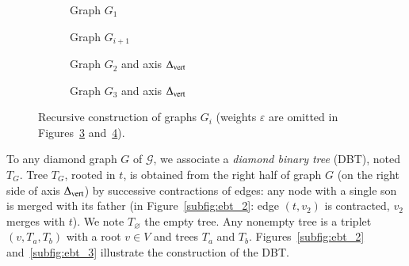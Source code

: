 \documentclass[preprint]{elsarticle}
\newcommand{\set}[1]{\left\{ #1 \right\}}
\newcommand{\card}[1]{\left| #1 \right|}
\newcommand{\mcalg}{\mathcal{G}}
\newcommand{\mts}{MS}
\newcommand{\deltavert}{\Delta_{\mbox{\scriptsize{vert}}}}
\newcommand{\ebt}{DBT}
\begin{document}
\begin{figure}[h]
\centering
\begin{subfigure}[b]{0.49\columnwidth}
\centering
\scalebox{.52}{}
\caption{Graph $G_1$}
\label{subfig:G_1}
\end{subfigure}
\begin{subfigure}[b]{0.49\columnwidth}
\centering
\scalebox{.52}{}
\caption{Graph $G_{i+1}$}
\label{subfig:G_i}
\end{subfigure}
\begin{subfigure}[b]{0.49\columnwidth}
\centering
\scalebox{.45}{}
\caption{Graph $G_2$ and axis $\deltavert$}
\label{subfig:G_2}
\end{subfigure}
\begin{subfigure}[b]{0.49\columnwidth}
\centering
\scalebox{0.45}{}
\caption{Graph $G_3$ and axis $\deltavert$}
\label{subfig:G_3}
\end{subfigure}
\caption{Recursive construction of graphs $G_i$ 
(weights $\varepsilon$ are omitted in Figures~\ref{subfig:G_2} and~\ref{subfig:G_3}).
}
\label{fig:G_i}
\end{figure}

%

To any diamond graph $G$ of $\mcalg$, we associate a \textit{diamond binary tree} (\ebt ), noted $T_G$. Tree $T_G$, rooted in $t$, is obtained from the right half of graph $G$ (on the right side of axis $\deltavert$) by successive contractions of edges: any node with a single son is merged with its father (in Figure~\ref{subfig:ebt_2}: edge $\left(t,v_2\right)$ is contracted, $v_2$ merges with $t$). 
We note $T_\varnothing$ the empty tree. Any nonempty tree is a triplet $(v, T_a, T_b)$ with a root $v \in V$ and trees $T_a$ and $T_b$. Figures~\ref{subfig:ebt_2} and~\ref{subfig:ebt_3} illustrate the construction of the \ebt . 
\end{document}
